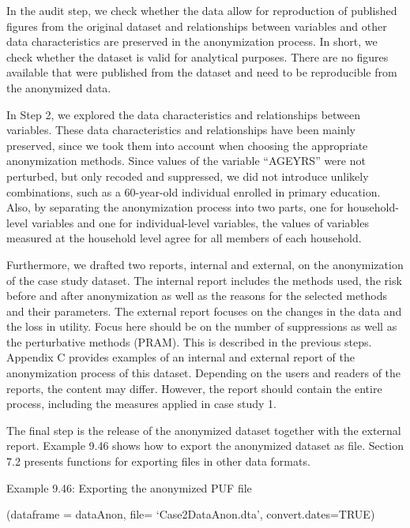 \documentclass[letterpaper,10pt,english]{sphinxmanual}
\begin{document}

In the audit step, we check whether the data allow for reproduction of
published figures from the original dataset and relationships between
variables and other data characteristics are preserved in the
anonymization process. In short, we check whether the dataset is valid
for analytical purposes. There are no figures available that were
published from the dataset and need to be reproducible from the
anonymized data.

In Step 2, we explored the data characteristics and relationships
between variables. These data characteristics and relationships have
been mainly preserved, since we took them into account when choosing the
appropriate anonymization methods. Since values of the variable “AGEYRS”
were not perturbed, but only recoded and suppressed, we did not
introduce unlikely combinations, such as a 60-year-old individual
enrolled in primary education. Also, by separating the anonymization
process into two parts, one for household-level variables and one for
individual-level variables, the values of variables measured at the
household level agree for all members of each household.

Furthermore, we drafted two reports, internal and external, on the
anonymization of the case study dataset. The internal report includes
the methods used, the risk before and after anonymization as well as the
reasons for the selected methods and their parameters. The external
report focuses on the changes in the data and the loss in utility. Focus
here should be on the number of suppressions as well as the perturbative
methods (PRAM). This is described in the previous steps. 
Appendix C provides examples of an internal and external report of the
anonymization process of this dataset. Depending on the users and
readers of the reports, the content may differ.   However, the
report should contain the entire process, including the measures applied
in case study 1.


The final step is the release of the anonymized dataset together with
the external report. Example 9.46 shows how to export the anonymized
dataset as  file. Section 7.2 presents functions for exporting
files in other data formats.

Example 9.46: Exporting the anonymized PUF file

\begin{DUlineblock}{0em}
\item[] 
\item[] (dataframe = dataAnon, file= ‘Case2DataAnon.dta’,
convert.dates=TRUE)
\end{DUlineblock}



\renewcommand{\indexname}{Index}
\printindex
\end{document}
